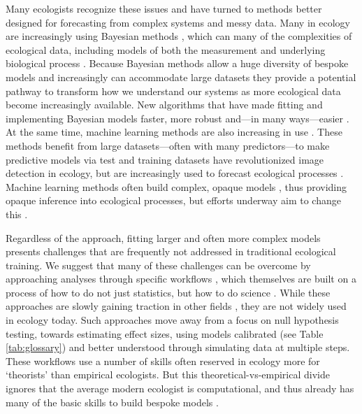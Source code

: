 \documentclass[11pt]{article}
\begin{document}
Many ecologists recognize these issues and have turned to methods better designed for forecasting from complex systems and messy data. Many in ecology are increasingly using Bayesian methods \citep{anderson2021trends}, which can many of the complexities of ecological data, including models of both the measurement and underlying biological process \citep{hobbs2006alternatives}. Because Bayesian methods allow a huge diversity of bespoke models and increasingly can accommodate large datasets they provide a potential pathway to transform how we understand our systems as more ecological data become increasingly available. New algorithms \citep[e.g. Hamiltonian Monte Carlo,][]{nuts2014,betan2019} that have made fitting and implementing Bayesian models faster, more robust and---in many ways---easier \citep{Carpenter:2017stan}. At the same time, machine learning methods are also increasing in use \citep{pichler2023machine}. These methods benefit from large datasets---often with many predictors---to make predictive models via test and training datasets \citep{breiman2001statistical} have revolutionized image detection in ecology, but are increasingly used to forecast ecological processes \citep[e.g.,][]{zwart2023near}. Machine learning methods often build complex, opaque models \citep{breiman2001statistical,shmueli2010explain}, thus providing opaque inference into ecological processes, but efforts underway aim to change this \citep[e.g.,][]{kutz2023machine}. 

Regardless of the approach, fitting larger and often more complex models presents challenges that are frequently not addressed in traditional ecological training. We suggest that many of these challenges can be overcome by approaching analyses through specific workflows \citep{betanworkflow,grinsztajn2021,vandeschoot2021}, which themselves are built on a process of how to do not just statistics, but how to do science \citep{box1976science}. While these approaches are slowly gaining traction in other fields \citep[e.g.,][]{esfahani2021bayesian,schad2021,bouman2024bayesian}, they are not widely used in ecology today. Such approaches move away from a focus on null hypothesis testing, towards estimating effect sizes, using models calibrated (see Table \ref{tab:glossary}) and better understood through simulating data at multiple steps. These workflows use a number of skills often reserved in ecology more for `theorists' than empirical ecologists. But this theoretical-vs-empirical divide ignores that the average modern ecologist is computational, and thus already has many of the basic skills to build bespoke models \citep{hilborn2013ecological}. 
\end{document}
